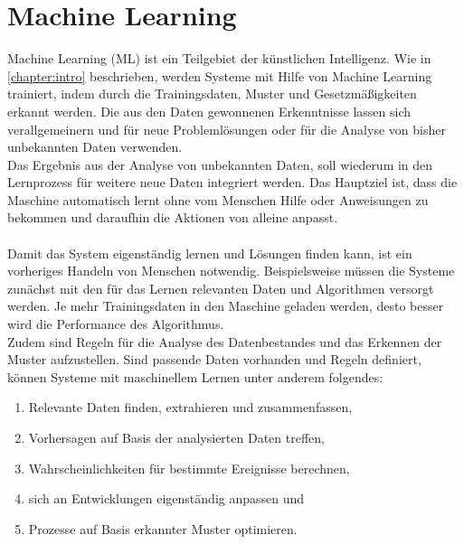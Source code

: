 \documentclass[12pt,oneside,a4paper,parskip]{scrbook}
\begin{document}
\section{Machine Learning}
Machine Learning (ML) ist ein Teilgebiet der künstlichen Intelligenz. Wie in \ref{chapter:intro} beschrieben, werden Systeme mit Hilfe von Machine Learning trainiert, indem durch die Trainingsdaten, Muster und Gesetzmäßigkeiten erkannt werden. Die aus den Daten gewonnenen Erkenntnisse lassen sich verallgemeinern und für neue Problemlösungen oder für die Analyse von bisher unbekannten Daten verwenden.\\
Das Ergebnis aus der Analyse von unbekannten Daten, soll wiederum in den Lernprozess für weitere neue Daten integriert werden. Das Hauptziel ist, dass die Maschine automatisch lernt ohne vom Menschen Hilfe oder Anweisungen zu bekommen und daraufhin die Aktionen von alleine anpasst\cite{EliminateHumanBias}.
\\\\
Damit das System eigenständig lernen und Lösungen finden kann, ist ein vorheriges Handeln von Menschen notwendig. Beispielsweise müssen die Systeme zunächst mit den für das Lernen relevanten Daten und Algorithmen versorgt werden.
Je mehr Trainingsdaten in den Maschine geladen werden, desto besser wird die Performance des Algorithmus.\\
Zudem sind Regeln für die Analyse des Datenbestandes und das Erkennen der Muster aufzustellen. Sind passende Daten vorhanden und Regeln definiert, können Systeme mit maschinellem Lernen unter anderem folgendes:

\begin{enumerate}
	\item Relevante Daten finden, extrahieren und zusammenfassen,
	\item Vorhersagen auf Basis der analysierten Daten treffen,
	\item Wahrscheinlichkeiten für bestimmte Ereignisse berechnen,
	\item sich an Entwicklungen eigenständig anpassen und
	\item Prozesse auf Basis erkannter Muster optimieren.
\end{enumerate}
\end{document}
